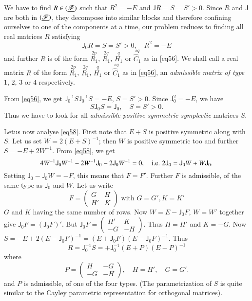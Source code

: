 We have to find $R\in (\underline{\mathscr{F}})$ such that $R^{2}=-E$ and
$\mathsf{J}R=S=S'>0$. Since $R$ and $\mathsf{J}$ are both in
$(\underline{\mathscr{F}})$, they decompose into similar blocks and therefore
confining ourselves to one of the components at a time, our problem
reduces to finding all real matrices $R$ satisfying
\begin{equation*}
\mathsf{J}_{0}R=S=S'>0,\quad R^{2}=-E\tag{57}\label{eq57}
\end{equation*}
and further $R$ is of the form $\overset{2p}{R_{1}}$,
$\overset{2q}{R_{1}}$, $\overset{q}{H_{1}}$ or
$\overset{sq}{\widehat{C}_{1}}$ as in \eqref{eq56}. We shall call a real
matrix $R$ of the form $\overset{2p}{R_{1}}$, $\overset{2q}{R_{1}}$,
$\overset{q}{H_{1}}$ or $\overset{sq}{\widehat{C}_{1}}$ as in
\eqref{eq56}, an {\em admissible matrix of type} $1$, $2$, $3$ or $4$
respectively.

From \eqref{eq56}, we get $\mathsf{J}^{-1}_{0}S\mathsf{J}^{-1}_{0}S=-E$,
$S=S'>0$. Since $\mathsf{J}^{2}_{0}=-E$, we have
\begin{equation*}
S\mathsf{J}_{0}S=\mathsf{J}_{0},\quad S=S'>0.\tag{58}\label{eq58}
\end{equation*}
Thus we have to look for all {\em admissible positive symmetric
  symplectic} matrices $S$.

Let\pageoriginale us now analyse \eqref{eq58}. First note that $E+S$ is
positive symmetric along with $S$. Let us set $W=2(E+S)^{-1}$; then
$W$ is positive symmetric too and further $S=-E+2W^{-1}$. From
\eqref{eq58}, we get
$$
4W^{-1}\mathsf{J}_{0}W^{-1}-2W^{-1}\mathsf{J}_{0}-2\mathsf{J}_{0}W^{-1}=0,\quad
\text{{i.e.}\kern.3em} 2\mathsf{J}_{0}=\mathsf{J}_{0}W+W\mathsf{J}_{0}. 
$$
Setting $\mathsf{J}_{0}-\mathsf{J}_{0}W=-F$, this means that
$F=F'$. Further $F$ is admissible, of the same type as
$\mathsf{J}_{0}$ and $W$. Let us write
$$
F=
\begin{pmatrix}
G & H\\
H' & K
\end{pmatrix}
\text{ \ with \ } G=G', K=K'
$$
$G$ and $K$ having the same number of rows. Now $W=E-\mathsf{J}_{0}F$,
$W=W'$ together give $\mathsf{J}_{0}F=(\mathsf{J}_{0}F)'$. But
$\mathsf{J}_{0}F=\left(\begin{smallmatrix} H' & K\\ -G & -H
\end{smallmatrix}\right)$. Thus $H=H'$ and $K=-G$. Now
$S=-E+2(E-\mathsf{J}_{0}F)^{-1}=(E+\mathsf{J}_{0}F)(E-\mathsf{J}_{0}F)^{-1}$. Thus
\begin{equation*}
R=\mathsf{J}^{-1}_{0}S=+\mathsf{J}^{-1}_{0}(E+P)(E-P)^{-1}\tag{59}\label{eq59}
\end{equation*}
where
\begin{equation*}
P=
\begin{pmatrix}
H & -G\\
-G & -H
\end{pmatrix},\quad H=H',\quad G=G'.\tag{60}\label{eq60}
\end{equation*}
and $P$ is admissible, of one of the four types. (The parametrization
of $S$ is quite similar to the Cayley parametric representation for
orthogonal matrices).


